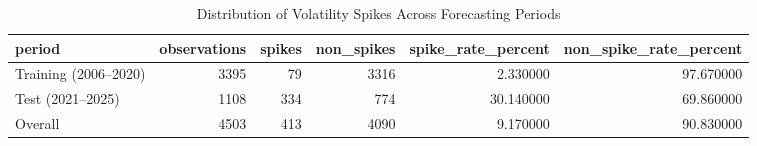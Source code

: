 \begin{table}
\caption{Distribution of Volatility Spikes Across Forecasting Periods}
\label{tab:4.3}
\begin{tabular}{lrrrrr}
\toprule
period & observations & spikes & non_spikes & spike_rate_percent & non_spike_rate_percent \\
\midrule
Training (2006–2020) & 3395 & 79 & 3316 & 2.330000 & 97.670000 \\
Test (2021–2025) & 1108 & 334 & 774 & 30.140000 & 69.860000 \\
Overall & 4503 & 413 & 4090 & 9.170000 & 90.830000 \\
\bottomrule
\end{tabular}
\end{table}
